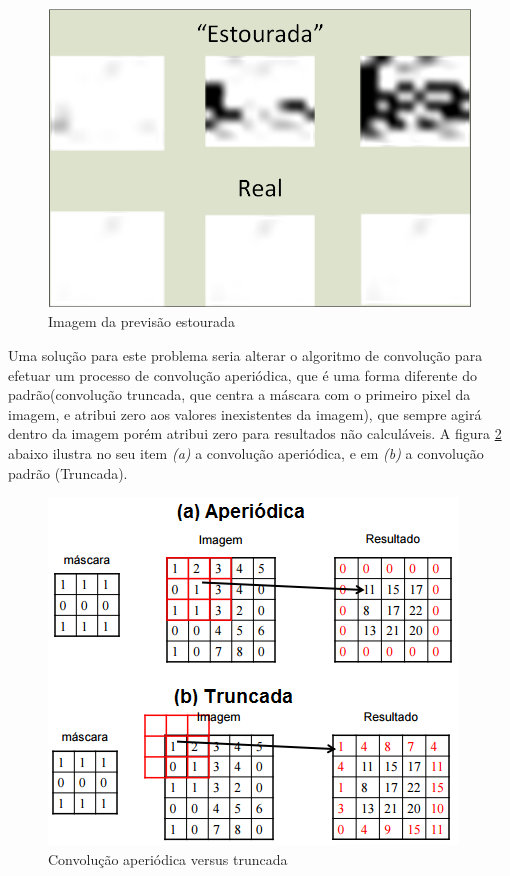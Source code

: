 \begin{figure}[h]
	\centering	
    \includegraphics[scale=1]{Figuras/Image-PrevisaoEstourada.png}
	\caption{Imagem da previsão estourada}
	\label{fig:ForecastingSpike}
\end{figure}

Uma solução para este problema seria alterar o algoritmo de convolução para efetuar um processo de convolução aperiódica, que é uma forma diferente do padrão(convolução truncada, que centra a máscara com o primeiro pixel da imagem, e atribui zero aos valores inexistentes da imagem), que sempre agirá dentro da imagem porém atribui zero para resultados não calculáveis. A figura \ref{fig:convApvsTr} abaixo ilustra no seu item \emph{(a)} a convolução aperiódica, e em \emph{(b)} a convolução padrão (Truncada).

\begin{figure}[h]
	\centering	
    \includegraphics[scale=1]{Figuras/ConvolucaoAperiodica.png}
	\caption{Convolução aperiódica versus truncada}
	\label{fig:convApvsTr}
\end{figure}

